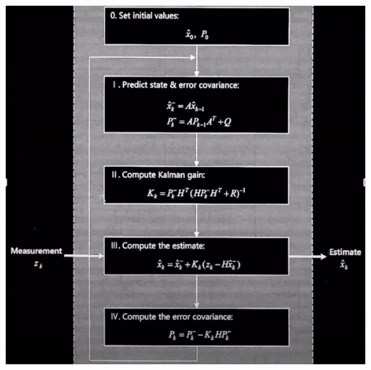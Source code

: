\begin{minipage}{0.4\textwidth}
\centering
\includegraphics[width=1\textwidth]{resources/chapter-4/kalman-fillter-2.png}
\end{minipage}
\\ \\

